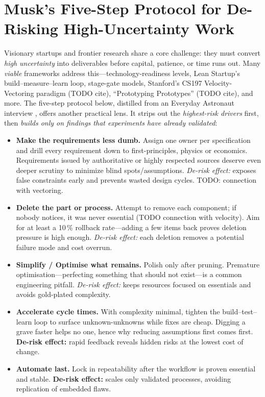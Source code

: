 
\section{Musk's Five-Step Protocol for De-Risking High-Uncertainty Work}
\label{sec:elon_five_steps}

Visionary startups and frontier research share a core challenge: they must
convert \emph{high uncertainty} into deliverables before capital, patience, or
time runs out.
Many \textit{viable} frameworks address this---technology-readiness levels,
Lean Startup's build--measure--learn loop, stage-gate models, Stanford's
CS197 Velocity-Vectoring paradigm (TODO cite), ``Prototyping Prototypes'' (TODO cite), and
more.
The five-step protocol below, distilled from an Everyday Astronaut interview
\cite{musk2021fivesteps}, offers another practical lens.
It strips out the \textit{highest-risk drivers} first, then
\textit{builds only on findings that experiments have already validated}:

\begin{itemize}[leftmargin=*]
  \item \textbf{Make the requirements less dumb.}
        Assign one owner per specification and drill every requirement down to first-principles, physics or economics.
        Requirements issued by authoritative or highly respected sources deserve even deeper scrutiny to minimize blind spots/assumptions.
        \textit{De-risk effect:} exposes false constraints early and prevents wasted design cycles.
        TODO: connection with vectoring.
  \item \textbf{Delete the part or process.}
        Attempt to remove each component; if nobody notices, it was never essential (TODO connection with velocity).
        Aim for at least a 10\,\% rollback rate---adding a few items back proves deletion pressure is high enough.
        \textit{De-risk effect:} each deletion removes a potential failure mode and cost overrun.
  \item \textbf{Simplify / Optimise what remains.}
        Polish only after pruning.
        Premature optimisation---perfecting something that should not exist---is a common engineering pitfall.
        \textit{De-risk effect:} keeps resources focused on essentials and avoids gold-plated complexity.
  \item \textbf{Accelerate cycle times.}
        With complexity minimal, tighten the build--test--learn loop to surface unknown-unknowns while fixes are cheap.
        Digging a grave faster helps no one, hence why reducing assumptions first comes first.
        \textbf{De-risk effect:} rapid feedback reveals hidden risks at the lowest cost of change.
  \item \textbf{Automate last.}
        Lock in repeatability after the workflow is proven essential and stable.
        \textbf{De-risk effect:} scales only validated processes, avoiding replication of embedded flaws.
\end{itemize}

